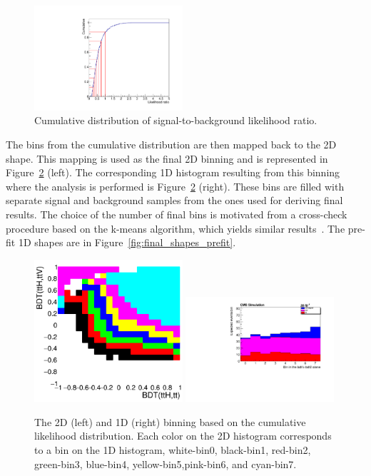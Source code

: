 \begin{figure}[htp]
\centering
\includegraphics[width=0.49\textwidth]{ch8_figs/cumulative_2lss.pdf}
\caption[Cumulative distribution of signal-to-background likelihood ratio]{Cumulative distribution of signal-to-background likelihood ratio.}
\label{fig:cum_dist}
\end{figure}

\noindent The bins from the cumulative distribution are then mapped back to the 2D shape. This mapping is used as the final 2D binning and is represented in Figure~\ref{fig:likelihood} (left).
The corresponding 1D histogram resulting from this binning where the analysis is performed is Figure~\ref{fig:likelihood} (right). These bins are filled with separate signal and background
samples from the ones used for deriving final results. The choice of the number of final bins is motivated from a cross-check procedure based on the k-means algorithm, which yields similar
results~\cite{CMS-AN-17-029}. The pre-fit 1D shapes are in Figure~\ref{fig:final_shapes_prefit}. 

\begin{figure}[htp]
\centering
\includegraphics[width=0.49\textwidth]{ch8_figs/likelihoodBased_2d_2lss.png}
\includegraphics[width=0.49\textwidth]{ch8_figs/likelihoodBased_1d_2lss.pdf}
\caption[The 2D and 1D binning based on the cumulative likelihood distribution]{The 2D (left) and 1D (right) binning based on the cumulative likelihood distribution.
Each color on the 2D histogram corresponds to a bin on the 1D histogram, white-bin0, black-bin1, red-bin2, green-bin3, blue-bin4, yellow-bin5,pink-bin6, and cyan-bin7.}
\label{fig:likelihood}
\end{figure}

